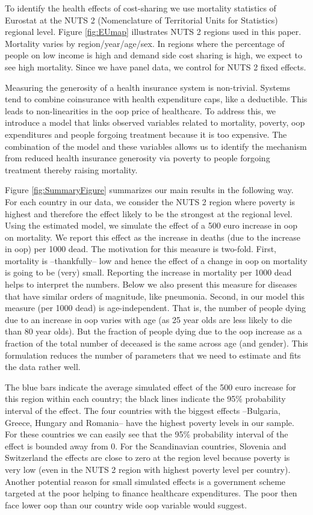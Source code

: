 \documentclass[a4paper,12pt]{article}
\begin{document}
To identify the health effects of cost-sharing we use mortality statistics of Eurostat at the NUTS 2 (Nomenclature of Territorial Units for Statistics) regional level. Figure \ref{fig:EUmap} illustrates NUTS 2 regions used in this paper. Mortality varies by region/year/age/sex. In regions where the percentage of people on low income is high and demand side cost sharing is high, we expect to see high mortality. Since we have panel data, we control for NUTS 2 fixed effects.

Measuring the generosity of a health insurance system is non-trivial. Systems tend to combine coinsurance with health expenditure caps, like a deductible. This leads to non-linearities in the oop price of healthcare. To address this, we introduce a model that links observed variables related to mortality, poverty, oop expenditures and people forgoing treatment because it is too expensive. The combination of the model and these variables allows us to identify the mechanism from reduced health insurance generosity via poverty to people forgoing treatment thereby raising mortality.

Figure \ref{fig:SummaryFigure} summarizes our main results in the following way. For each country in our data, we consider the NUTS 2 region where poverty is highest and therefore the effect likely to be the strongest at the regional level. Using the estimated model, we simulate the effect of a 500 euro increase in oop on mortality. We report this effect as the increase in deaths (due to the increase in oop) per 1000 dead. The motivation for this measure is two-fold. First, mortality is --thankfully-- low and hence the effect of a change in oop on mortality is going to be (very) small. Reporting the increase in mortality per 1000 dead helps to interpret the numbers. Below we also present this measure for diseases that have similar orders of magnitude, like pneumonia. Second, in our model this measure (per 1000 dead) is age-independent. That is, the number of people dying due to an increase in oop varies with age (as 25 year olds are less likely to die than 80 year olds). But the fraction of people dying due to the oop increase as a fraction of the total number of deceased is the same across age (and gender). This formulation reduces the number of parameters that we need to estimate and fits the data rather well. 

The blue bars indicate the average simulated effect of the 500 euro increase for this region within each country; the black lines indicate the 95\% probability interval of the effect. The four countries with the biggest effects --Bulgaria, Greece, Hungary and Romania-- have the highest poverty levels in our sample. For these countries we can easily see that the 95\% probability interval of the effect is bounded away from 0. For the Scandinavian countries, Slovenia and Switzerland the effects are close to zero at the region level because poverty is very low (even in the NUTS 2 region with highest poverty level per country). Another potential reason for small simulated effects is a government scheme targeted at the poor helping to finance healthcare expenditures. The poor then face lower oop than our country wide oop variable would suggest. 
\end{document}
